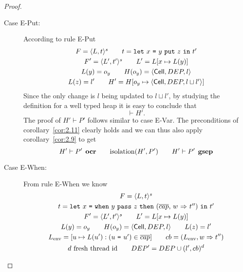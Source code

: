 \begin{proof}
\begin{description}
\begin{description}
\begin{description}
            \item[Case {\sc E-Put}:] According to rule {\sc E-Put}
              \begin{equation}
                \begin{gathered}
                  F = \mbox{$\langle L, t \rangle^s$} \quad\quad t = \mbox{\texttt{let}~$x$~\texttt{=}~$\mbox{$y$~\texttt{put}~$z$}$~\texttt{in}~$t'$} \\
                  F' = \mbox{$\langle L', t' \rangle^s$} \quad\quad L' = L[x \mapsto L(y)] \\
                  L(y) = o_y \quad\quad H(o_y) = \mbox{$\langle \mbox{$\mathsf{Cell}$}{}, DEP, l \rangle$} \\
                  L(z) = l' \quad\quad H' = H[o_y \mapsto \mbox{$\langle \mbox{$\mathsf{Cell}$}{}, DEP, l \sqcup l' \rangle$}]
                \end{gathered}
              \end{equation}
              Since the only change is $l$ being updated to $l \sqcup l'$, by
              studying the definition for a well typed heap it is easy to
              conclude that
              \begin{equation}
                \vdash H'.
              \end{equation}
              The proof of $H' \vdash P'$ follows similar to case {\sc E-Var}.
              The preconditions of corollary~\ref{cor:2.11} clearly holds and we
              can thus also apply corollary~\ref{cor:2.9} to get
              \begin{equation}
                H' \vdash P' \:\: \mbox{\bf ocr} \quad\quad \mbox{$\mathrm{isolation}$}(H', P') \quad\quad H'
                \vdash P' \:\: \mbox{\bf gsep}
              \end{equation}
            \item[Case {\sc E-When}:] From rule {\sc E-When} we know
              \begin{equation}
                \begin{gathered}
                  F = \sframe{L, t} \\ 
                  t = \Let{x}{\When{y}{z}{\CB{\overline{cap}}{w}{t''}}}{t'} \\
                  F' = \sframe{L', t'} \andalso L' = L[x \mapsto L(y)] \\
                  L(y) = o_y \andalso H(o_y) = \Cell{DEP, l} \andalso L(z) = l' \\
                  L_{\text{env}} = [u \mapsto L(u'): (\Capt{u}{u'}) \in
                  \overline{cap}] \andalso cb = (L_{\text{env}}, w \Rightarrow
                  t'') \\
                  d \text{ fresh thread id} \andalso DEP' = DEP \cup (l', cb)^d

\end{gathered}
\end{equation}
\end{description}
\end{description}
\end{description}
\end{proof}
